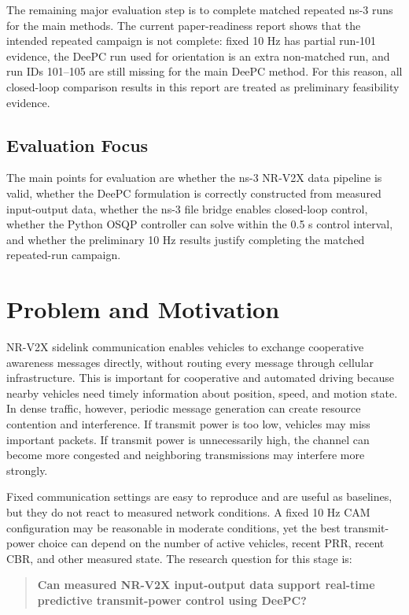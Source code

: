 \documentclass[11pt]{article}
\newcommand{\deePC}{DeePC}
\begin{document}
The remaining major evaluation step is to complete matched repeated ns-3 runs
for the main methods. The current paper-readiness report shows that the
intended repeated campaign is not complete: fixed 10 Hz has partial run-101
evidence, the \deePC{} run used for orientation is an extra non-matched run,
and run IDs 101--105 are still missing for the main \deePC{} method. For this
reason, all closed-loop comparison results in this report are treated as
preliminary feasibility evidence.

\subsection*{Evaluation Focus}

The main points for evaluation are whether the ns-3 NR-V2X data pipeline is
valid, whether the \deePC{} formulation is correctly constructed from measured
input-output data, whether the ns-3 file bridge enables closed-loop control,
whether the Python OSQP controller can solve within the 0.5 s control interval,
and whether the preliminary 10 Hz results justify completing the matched
repeated-run campaign.

\section{Problem and Motivation}

NR-V2X sidelink communication enables vehicles to exchange cooperative
awareness messages directly, without routing every message through cellular
infrastructure. This is important for cooperative and automated driving because
nearby vehicles need timely information about position, speed, and motion
state. In dense traffic, however, periodic message generation can create
resource contention and interference. If transmit power is too low, vehicles
may miss important packets. If transmit power is unnecessarily high, the
channel can become more congested and neighboring transmissions may interfere
more strongly.

Fixed communication settings are easy to reproduce and are useful as baselines,
but they do not react to measured network conditions. A fixed 10 Hz CAM
configuration may be reasonable in moderate conditions, yet the best
transmit-power choice can depend on the number of active vehicles, recent PRR,
recent CBR, and other measured state. The research question for this stage is:

\begin{quote}
\textbf{Can measured NR-V2X input-output data support real-time predictive
transmit-power control using \deePC?}
\end{quote}
\end{document}
